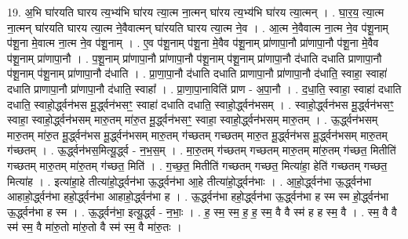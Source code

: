 \documentclass[17pt]{extarticle}
\begin{document}
19. अ॒भि घा॑रयति घारय त्य॒भ्य॑भि घा॑रय त्या॒त्म ना॒त्मन् घा॑रय त्य॒भ्य॑भि घा॑रय त्या॒त्मन् । . घा॒र॒य॒ त्या॒त्म ना॒त्मन् घा॑रयति घारय त्या॒त्म ने॒वैवात्मन् घा॑रयति घारय त्या॒त्म ने॒व । . आ॒त्म ने॒वैवात्म ना॒त्म ने॒व प॑शू॒नाम् प॑शू॒ना मे॒वात्म ना॒त्म ने॒व प॑शू॒नाम् । . ए॒व प॑शू॒नाम् प॑शू॒ना मे॒वैव प॑शू॒नाम् प्रा॑णापा॒नौ प्रा॑णापा॒नौ प॑शू॒ना मे॒वैव प॑शू॒नाम् प्रा॑णापा॒नौ । . प॒शू॒नाम् प्रा॑णापा॒नौ प्रा॑णापा॒नौ प॑शू॒नाम् प॑शू॒नाम् प्रा॑णापा॒नौ द॑धाति दधाति प्राणापा॒नौ प॑शू॒नाम् प॑शू॒नाम् प्रा॑णापा॒नौ द॑धाति । . प्रा॒णा॒पा॒नौ द॑धाति दधाति प्राणापा॒नौ प्रा॑णापा॒नौ द॑धाति॒ स्वाहा॒ स्वाहा॑ दधाति प्राणापा॒नौ प्रा॑णापा॒नौ द॑धाति॒ स्वाहा᳚ । . प्रा॒णा॒पा॒नाविति॑ प्राण - अ॒पा॒नौ । . द॒धा॒ति॒ स्वाहा॒ स्वाहा॑ दधाति दधाति॒ स्वाहो॒र्द्ध्वन॑भस मू॒र्द्ध्वन॑भसꣳ॒॒ स्वाहा॑ दधाति दधाति॒ स्वाहो॒र्द्ध्वन॑भसम् । . स्वाहो॒र्द्ध्वन॑भस मू॒र्द्ध्वन॑भसꣳ॒॒ स्वाहा॒ स्वाहो॒र्द्ध्वन॑भसम् मारु॒तम् मा॑रु॒त मू॒र्द्ध्वन॑भसꣳ॒॒ स्वाहा॒ स्वाहो॒र्द्ध्वन॑भसम् मारु॒तम् । . ऊ॒र्द्ध्वन॑भसम् मारु॒तम् मा॑रु॒त मू॒र्द्ध्वन॑भस मू॒र्द्ध्वन॑भसम् मारु॒तम् ग॑च्छतम् गच्छतम् मारु॒त मू॒र्द्ध्वन॑भस मू॒र्द्ध्वन॑भसम् मारु॒तम् ग॑च्छतम् । . ऊ॒र्द्ध्वन॑भस॒मित्यू॒र्द्ध्व - न॒भ॒स॒म् । . मा॒रु॒तम् ग॑च्छतम् गच्छतम् मारु॒तम् मा॑रु॒तम् ग॑च्छत॒ मितीति॑ गच्छतम् मारु॒तम् मा॑रु॒तम् ग॑च्छत॒ मिति॑ । . ग॒च्छ॒त॒ मितीति॑ गच्छतम् गच्छत॒ मित्या॑हा॒ हेति॑ गच्छतम् गच्छत॒ मित्या॑ह । . इत्या॑हा॒हे तीत्या॑हो॒र्द्ध्वन॑भा ऊ॒र्द्ध्वन॑भा आ॒हे तीत्या॑हो॒र्द्ध्वन॑भाः । . आ॒हो॒र्द्ध्वन॑भा ऊ॒र्द्ध्वन॑भा आहाहो॒र्द्ध्वन॑भा हहो॒र्द्ध्वन॑भा आहाहो॒र्द्ध्वन॑भा ह । . ऊ॒र्द्ध्वन॑भा हहो॒र्द्ध्वन॑भा ऊ॒र्द्ध्वन॑भा ह स्म स्म हो॒र्द्ध्वन॑भा ऊ॒र्द्ध्वन॑भा ह स्म । . ऊ॒र्द्ध्वन॑भा॒ इत्यू॒र्द्ध्व - न॒भाः॒ । . ह॒ स्म॒ स्म॒ ह॒ ह॒ स्म॒ वै वै स्म॑ ह ह स्म॒ वै । . स्म॒ वै वै स्म॑ स्म॒ वै मा॑रु॒तो मा॑रु॒तो वै स्म॑ स्म॒ वै मा॑रु॒तः । \newline
\end{document}
